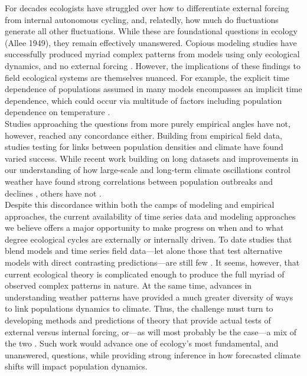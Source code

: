 \documentclass[11pt,a4paper,oneside]{article}
\begin{document}
For decades ecologists have struggled over how to differentiate external forcing from internal autonomous cycling, and, relatedly, how much do fluctuations generate all other fluctuations. While these are foundational questions in ecology (Allee 1949), they remain effectively unanswered. Copious modeling studies have successfully produced myriad complex patterns from models using only ecological dynamics, and no external forcing \citep{May1976}. However, the implications of these findings to field ecological systems are themselves nuanced. For example, the explicit time dependence of populations assumed in many models encompasses an implicit time dependence, which could occur via  multitude of factors including population dependence on temperature \citep{Gurney1985}. \\ %

Studies approaching the questions from more purely empirical angles have not, however, reached any concordance either. Building from empirical field data, studies testing for links between population densities and climate have found varied success. While recent work building on long datasets and improvements in our understanding of how large-scale and long-term climate oscillations control weather have found strong correlations between population outbreaks \citep{Stige2007} and declines \citep{Coulson2001}, others have not \citep{Knape2011}. \\ %

Despite this discordance within both the camps of modeling and empirical approaches, the current availability of time series data and modeling approaches we believe offers a major opportunity to make progress on when and to what degree ecological cycles are externally or internally driven. To date studies that blend models and time series field data---let alone those that test alternative models with direct contrasting predictions---are still few \citep{Bjornstad2001,Knape2011}.  It seems, however, that current ecological theory is complicated enough to produce the full myriad of observed complex patterns in nature. At the same time, advances in understanding weather patterns \citep{Bjornstad2001,Weart2013} have provided a much greater diversity of ways to link populations dynamics to climate. Thus, the challenge must turn to developing methods and predictions of theory that provide actual tests of external versus internal forcing, or---as will most probably be the case---a mix of the two \citep{Benton2006}. Such work would advance one of ecology's most fundamental, and unanswered, questions, while providing strong inference in how forecasted climate shifts will impact population dynamics.\\
\end{document}
